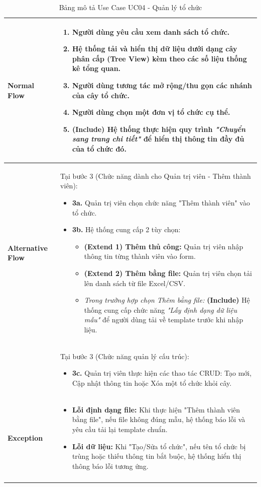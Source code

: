 \begin{longtable}{|m{}|m{}|}
\textbf{Normal Flow} 
&
\begin{enumerate}
    \item Người dùng yêu cầu xem danh sách tổ chức.
    \item Hệ thống tải và hiển thị dữ liệu dưới dạng cây phân cấp (Tree View) kèm theo các số liệu thống kê tổng quan.
    \item Người dùng tương tác mở rộng/thu gọn các nhánh của cây tổ chức.
    \item Người dùng chọn một đơn vị tổ chức cụ thể.
    \item \textbf{(Include)} Hệ thống thực hiện quy trình \textit{"Chuyển sang trang chi tiết"} để hiển thị thông tin đầy đủ của tổ chức đó.
\end{enumerate}
\\ 
\hline

\textbf{Alternative Flow} 
& Tại bước 3 (Chức năng dành cho Quản trị viên - Thêm thành viên):
\begin{itemize}
    \item \textbf{3a.} Quản trị viên chọn chức năng "Thêm thành viên" vào tổ chức.
    \item \textbf{3b.} Hệ thống cung cấp 2 tùy chọn:
    \begin{itemize}
        \item \textbf{(Extend 1) Thêm thủ công:} Quản trị viên nhập thông tin từng thành viên vào form.
        \item \textbf{(Extend 2) Thêm bằng file:} Quản trị viên chọn tải lên danh sách từ file Excel/CSV.
        \item \textit{Trong trường hợp chọn Thêm bằng file:} \textbf{(Include)} Hệ thống cung cấp chức năng \textit{"Lấy định dạng dữ liệu mẫu"} để người dùng tải về template trước khi nhập liệu.
    \end{itemize}
\end{itemize}
\\ 
& Tại bước 3 (Chức năng quản lý cấu trúc):
\begin{itemize}
    \item \textbf{3c.} Quản trị viên thực hiện các thao tác CRUD: Tạo mới, Cập nhật thông tin hoặc Xóa một tổ chức khỏi cây.
\end{itemize}
\\
\hline

\textbf{Exception} 
& 
\begin{itemize}
    \item \textbf{Lỗi định dạng file:} Khi thực hiện "Thêm thành viên bằng file", nếu file không đúng mẫu, hệ thống báo lỗi và yêu cầu tải lại template chuẩn.
    \item \textbf{Lỗi dữ liệu:} Khi "Tạo/Sửa tổ chức", nếu tên tổ chức bị trùng hoặc thiếu thông tin bắt buộc, hệ thống hiển thị thông báo lỗi tương ứng.
\end{itemize}
\\
\hline
\caption{Bảng mô tả Use Case UC04 - Quản lý tổ chức}
\end{longtable}